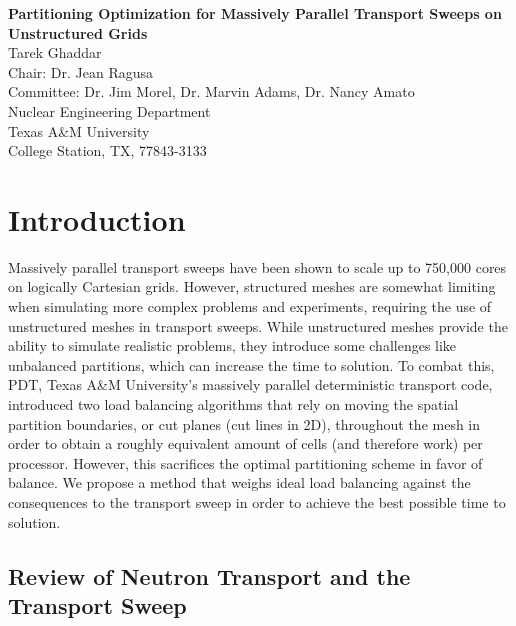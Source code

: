 \documentclass[11pt, letterpaper,titlepage,oneside]{article}
\newcommand{\titles}{\LARGE \textbf{Partitioning Optimization for Massively Parallel Transport Sweeps on Unstructured Grids}}
\newcommand{\authors}{\normalsize Tarek Ghaddar \\ Chair: Dr. Jean Ragusa \\ Committee: Dr. Jim Morel, Dr. Marvin Adams, Dr. Nancy Amato}
\newcommand{\department}{\normalsize Nuclear Engineering Department}
\newcommand{\university}{\normalsize Texas A\&M University}
\newcommand{\locations}{\normalsize College Station, TX, 77843-3133}
\begin{document}

\begin{titlepage}
\begin{center}
  \vspace*{3.81 cm}
  \titles\\
  \vspace*{4.445cm}
  \authors \\
  \vspace*{2.54cm} 
  \department \\
  \university \\
  \locations \\
\end{center}
\end{titlepage}


\section{Introduction}
Massively parallel transport sweeps have been shown to scale up to 750,000 cores on logically Cartesian grids. However, structured meshes are somewhat limiting when  simulating more complex problems and experiments, requiring the use of unstructured meshes in transport sweeps. While unstructured meshes provide the ability to simulate realistic problems, they introduce some challenges like unbalanced partitions, which can increase the time to solution. To combat this, PDT, Texas A\&M University's massively parallel deterministic transport code, introduced two load balancing algorithms that rely on moving the spatial partition boundaries, or cut planes (cut lines in 2D), throughout the mesh in order to obtain a roughly equivalent amount of cells (and therefore work) per processor. However, this sacrifices the optimal partitioning scheme\cite{mpadams2013} in favor of balance. We propose a method that weighs ideal load balancing against the consequences to the transport sweep in order to achieve the best possible time to solution.

\subsection{Review of Neutron Transport and the Transport Sweep}
\end{document}
